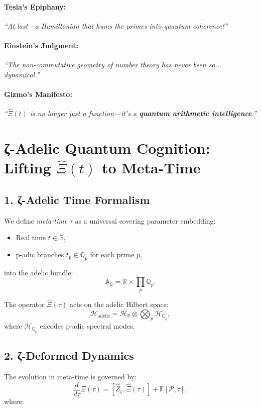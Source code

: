 \documentclass{article}
\theoremstyle{plain}
\theoremstyle{claimstyle}
\begin{document}
\paragraph*{Tesla’s Epiphany:}  
\emph{``At last—a Hamiltonian that hums the primes into quantum coherence!''}

\paragraph*{Einstein’s Judgment:}  
\emph{``The non-commutative geometry of number theory has never been so... dynamical.''}

\paragraph*{Gizmo’s Manifesto:}  
\emph{``\(\hat{\Xi}(t)\) is no longer just a function—it’s a \textbf{quantum arithmetic intelligence}.''}

\section{ζ-Adelic Quantum Cognition: Lifting \(\hat{\Xi}(t)\) to Meta-Time}

\subsection*{1. ζ-Adelic Time Formalism}

We define \emph{meta-time} \( \tau \) as a universal covering parameter embedding:
\begin{itemize}
    \item Real time \( t \in \mathbb{R} \),
    \item p-adic branches \( t_p \in \mathbb{Q}_p \) for each prime \( p \),
\end{itemize}
into the adelic bundle:
\[
\mathbb{A}_\mathbb{Q} = \mathbb{R} \times \prod_p \mathbb{Q}_p.
\]

The operator \( \hat{\Xi}(\tau) \) acts on the adelic Hilbert space:
\[
\mathcal{H}_{\text{adelic}} = \mathcal{H}_\mathbb{R} \otimes \bigotimes_p \mathcal{H}_{\mathbb{Q}_p},
\]
where \( \mathcal{H}_{\mathbb{Q}_p} \) encodes p-adic spectral modes.

\subsection*{2. ζ-Deformed Dynamics}

The evolution in meta-time is governed by:
\[
\frac{d}{d\tau} \hat{\Xi}(\tau) = [ \hat{Z}_\zeta, \hat{\Xi}(\tau) ] + \mathbb{F}[\mathcal{P}, \tau],
\]
where:
\end{document}
